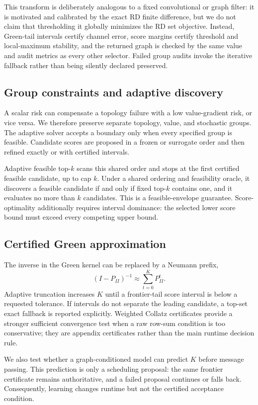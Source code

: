 \documentclass[10pt]{article}
\begin{document}
This transform is deliberately analogous to a fixed convolutional or graph
filter: it is motivated and calibrated by the exact RD finite difference, but
we do not claim that thresholding it globally minimizes the RD set objective.
Instead, Green-tail intervals certify channel error, score margins certify
threshold and local-maximum stability, and the returned graph is checked by
the same value and audit metrics as every other selector. Failed group audits
invoke the iterative fallback rather than being silently declared preserved.

\subsection{Group constraints and adaptive discovery}
A scalar risk can compensate a topology failure with a low value-gradient risk,
or vice versa. We therefore preserve separate topology, value, and stochastic
groups. The adaptive solver accepts a boundary only when every specified group
is feasible. Candidate scores are proposed in a frozen or surrogate order and
then refined exactly or with certified intervals.

Adaptive feasible top-$k$ scans this shared order and stops at the first
certified feasible candidate, up to cap $k$. Under a shared ordering and
feasibility oracle, it discovers a feasible candidate if and only if fixed
top-$k$ contains one, and it evaluates no more than $k$ candidates. This is a
feasible-envelope guarantee. Score-optimality additionally requires interval
dominance: the selected lower score bound must exceed every competing upper
bound.

\subsection{Certified Green approximation}
The inverse in the Green kernel can be replaced by a Neumann prefix,
\begin{equation}
(I-P_{II})^{-1}\approx\sum_{t=0}^{K}P_{II}^t.
\end{equation}
Adaptive truncation increases $K$ until a frontier-tail score interval is below
a requested tolerance. If intervals do not separate the leading candidate, a
top-set exact fallback is reported explicitly. Weighted Collatz certificates
provide a stronger sufficient convergence test when a raw row-sum condition is
too conservative; they are appendix certificates rather than the main runtime
decision rule.

We also test whether a graph-conditioned model can predict $K$ before message
passing. This prediction is only a scheduling proposal: the same frontier
certificate remains authoritative, and a failed proposal continues or falls
back. Consequently, learning changes runtime but not the certified acceptance
condition.
\end{document}

